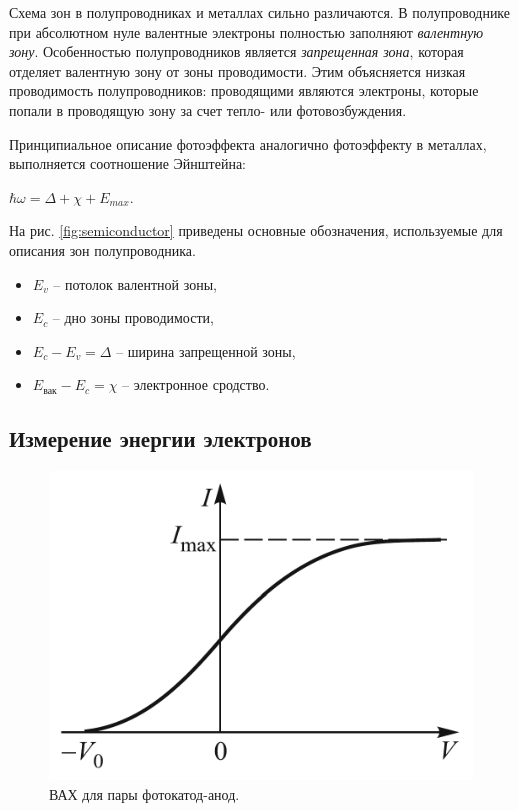 \documentclass[a4paper, 12pt]{article} %
\begin{document}
	Схема зон в полупроводниках и металлах сильно различаются. В полупроводнике при абсолютном нуле валентные электроны полностью заполняют \textit{валентную зону}. Особенностью полупроводников является \textit{запрещенная зона}, которая отделяет валентную зону от зоны проводимости. Этим объясняется низкая проводимость полупроводников: проводящими являются электроны, которые попали в проводящую зону за счет тепло- или фотовозбуждения.
	
	Принципиальное описание фотоэффекта аналогично фотоэффекту в металлах, выполняется соотношение Эйнштейна: 
	
	\begin{center}
		$\hbar \omega = \Delta + \chi + E_{max}$.
	\end{center}
	
	На рис. \ref{fig:semiconductor} приведены основные обозначения, используемые для описания зон полупроводника.
	
	\begin{itemize}[itemsep=0pt]
		\item $E_v$ -- потолок валентной зоны,
		\item $E_c$ -- дно зоны проводимости,
		\item $E_c - E_v = \Delta$ -- ширина запрещенной зоны,
		\item $E_{\text{вак}} - E_c = \chi$ -- электронное сродство.
	\end{itemize}
	
	\newpage
		
	\subsection{Измерение энергии электронов}
	\begin{figure}
		\includegraphics[scale=0.3]{res/iv_curve.png}
		\caption{ВАХ для пары фотокатод-анод.}
		\label{fig:iv_curve}
		\vspace{-10pt}
	\end{figure}
\end{document}
